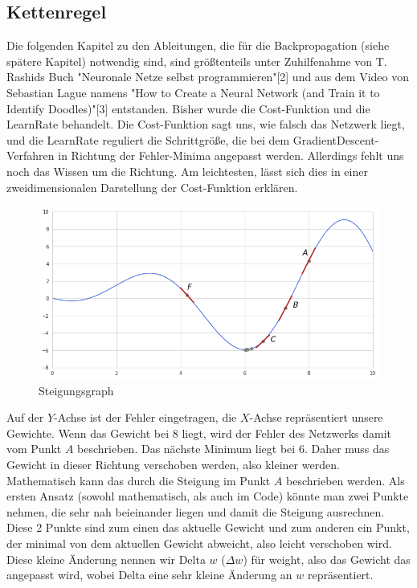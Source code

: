 \documentclass[12pt]{article}
\begin{document}
\subsection{Kettenregel}
Die folgenden Kapitel zu den Ableitungen, die für die Backpropagation (siehe spätere Kapitel) notwendig sind, sind größtenteils unter Zuhilfenahme von T. Rashids Buch "Neuronale Netze selbst programmieren"[2] und aus dem Video von Sebastian Lague namens "How to Create a Neural Network (and Train it to Identify Doodles)"[3] entstanden. 
Bisher wurde die Cost-Funktion und die LearnRate behandelt. Die Cost-Funktion sagt uns, wie falsch das Netzwerk liegt, und die LearnRate reguliert die Schrittgröße, die bei dem GradientDescent-Verfahren in Richtung der Fehler-Minima angepasst werden. Allerdings fehlt uns noch das Wissen um die Richtung. 
Am leichtesten, lässt sich dies in einer zweidimensionalen Darstellung der Cost-Funktion erklären.
\begin{figure}[H]
\centering
\includegraphics[scale=0.50]{./Images/Pasted image 20230917195146.png}
\caption{Steigungsgraph}
\label{Steigungsgraph}
\end{figure}
Auf der $Y$-Achse ist der Fehler eingetragen, die $X$-Achse repräsentiert unsere Gewichte. Wenn das Gewicht bei 8 liegt, wird der Fehler des Netzwerks damit vom Punkt $A$ beschrieben. Das nächste Minimum liegt bei 6. Daher muss das Gewicht in dieser Richtung verschoben werden, also kleiner werden. 
Mathematisch kann das durch die Steigung im Punkt $A$ beschrieben werden. Als ersten Ansatz (sowohl mathematisch, als auch im Code) könnte man zwei Punkte nehmen, die sehr nah beieinander liegen und damit die Steigung ausrechnen. Diese 2 Punkte sind zum einen das aktuelle Gewicht und zum anderen ein Punkt, der minimal von dem aktuellen Gewicht abweicht, also leicht verschoben wird.
Diese kleine Änderung nennen wir Delta $w$ ($\Delta w$) für weight, also das Gewicht das angepasst wird, wobei Delta eine sehr kleine Änderung an $w$ repräsentiert.
\end{document}
